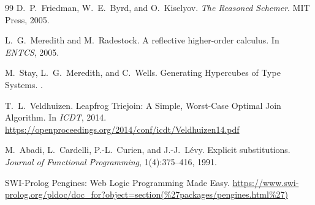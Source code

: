 \documentclass[11pt]{article}
\begin{document}
\begin{thebibliography}{99}
D.~P.~Friedman, W.~E.~Byrd, and O.~Kiselyov.
\newblock \emph{The Reasoned Schemer}.
\newblock MIT Press, 2005.

L.~G.~Meredith and M.~Radestock.
\newblock A reflective higher-order calculus.
\newblock In \emph{ENTCS}, 2005.

M.~Stay, L.~G.~Meredith, and C.~Wells.
\newblock Generating Hypercubes of Type Systems.
.

T.~L.~Veldhuizen.
\newblock Leapfrog Triejoin: A Simple, Worst-Case Optimal Join Algorithm.
\newblock In \emph{ICDT}, 2014.
\newblock \url{https://openproceedings.org/2014/conf/icdt/Veldhuizen14.pdf}

M.~Abadi, L.~Cardelli, P.-L.~Curien, and J.-J.~L\'{e}vy.
\newblock Explicit substitutions.
\newblock \emph{Journal of Functional Programming}, 1(4):375--416, 1991.

SWI-Prolog Pengines: Web Logic Programming Made Easy.
\newblock \url{https://www.swi-prolog.org/pldoc/doc_for?object=section(%27packages/pengines.html%27)}

\end{thebibliography}
\end{document}
